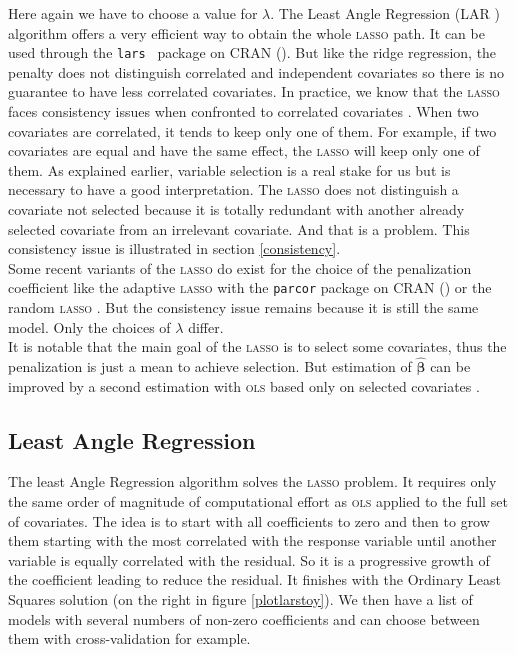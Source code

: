 \documentclass[12pt,a4paper]{report}
\begin{document}
		Here again we have to choose a value for $\lambda$.
	 The Least Angle Regression (\textsc{LAR} \cite{efron2004least}) algorithm offers a very efficient way to obtain the whole \textsc{lasso} path.  It can be used through the {\tt lars } package on CRAN (\cite{packagelars}). But like the ridge regression, the penalty does not distinguish correlated and independent covariates so there is no guarantee to have less correlated covariates. In practice, we know that the \textsc{lasso} faces consistency issues when confronted to correlated covariates \cite{Zhao2006MSC}. When two covariates are correlated, it tends to keep only one of them. For example, if two covariates are equal and have the same effect, the \textsc{lasso} will keep only one of them. As explained earlier, variable selection is a real stake for us but is necessary to have a good interpretation. The \textsc{lasso} does not distinguish a covariate not selected because it is totally redundant with another already selected covariate from an irrelevant covariate. And that is a problem. This consistency issue is illustrated in section \ref{consistency}.\\



			 Some recent variants of the \textsc{lasso} do exist for the choice of the penalization coefficient like the adaptive \textsc{lasso} \cite{zou2006adaptive} with the {\tt parcor} package on CRAN (\cite{packageparcor}) or the random \textsc{lasso} \cite{wang2011random}.  But the consistency issue remains because it is still the same model. Only the choices of $\lambda$ differ.\\
			 
			 It is notable that the main goal of the \textsc{lasso} is to select some covariates, thus the penalization is just a mean to achieve selection. But estimation of $\hat{\boldsymbol{\beta}}$ can be improved by a second estimation with \textsc{ols} based only on selected covariates \cite{SAM10088}.
		\subsection{Least Angle Regression}
		The least Angle Regression algorithm solves the \textsc{lasso} problem.
		It requires only the same order of magnitude of computational effort as \textsc{ols} applied to the full set of covariates.
		The idea is to start with all coefficients to zero and then to grow them starting with the most correlated with the response variable until another variable is equally correlated with the residual. So it is a progressive growth of the coefficient leading to reduce the residual. It finishes with the Ordinary Least Squares solution (on the right in figure \ref{plotlarstoy}). We then have a list of models with several numbers of non-zero coefficients and can choose between them with cross-validation for example.\\
		
\end{document}
